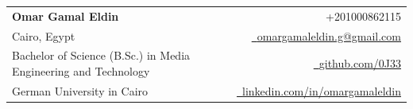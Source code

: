 \documentclass[a4paper,12pt]{article}
\makeatletter
\newcommand{\name}{Omar Gamal Eldin} %
\newcommand{\roll}{Cairo, Egypt} %
\newcommand{\phone}{01000862115} %
\newcommand{\emaila}{omargamaleldin.g@gmail.com} %
\makeatother
\begin{document}
\selectfont

{
\begin{tabularx}{\linewidth}{L r} \\
\vspace{-5.5mm}
  \textbf{\Large \name} & {\raisebox{0.0\height}{\footnotesize \faPhone}\ +2\phone}\\
  {\roll} & \href{mailto:\emaila}{\raisebox{0.0\height}{\footnotesize \faEnvelope}\ {\emaila}} \\
  Bachelor of Science (B.Sc.) in Media Engineering and Technology & \href{https://github.com/0J33}{\raisebox{0.0\height}{\footnotesize \faGithub}\ {github.com/0J33}} \\
  {German University in Cairo} & \href{https://www.linkedin.com/in/omargamaleldin}{\raisebox{0.0\height}{\footnotesize \faLinkedin}\ {linkedin.com/in/omargamaleldin}}
\end{tabularx}
}

\end{document}

